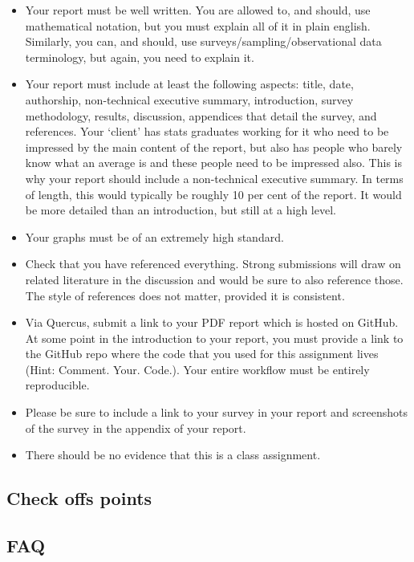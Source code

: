 \documentclass[
]{book}
\begin{document}
\begin{itemize}
\item
  Your report must be well written. You are allowed to, and should, use mathematical notation, but you must explain all of it in plain english. Similarly, you can, and should, use surveys/sampling/observational data terminology, but again, you need to explain it.
\item
  Your report must include at least the following aspects: title, date, authorship, non-technical executive summary, introduction, survey methodology, results, discussion, appendices that detail the survey, and references. Your `client' has stats graduates working for it who need to be impressed by the main content of the report, but also has people who barely know what an average is and these people need to be impressed also. This is why your report should include a non-technical executive summary. In terms of length, this would typically be roughly 10 per cent of the report. It would be more detailed than an introduction, but still at a high level.
\item
  Your graphs must be of an extremely high standard.
\item
  Check that you have referenced everything. Strong submissions will draw on related literature in the discussion and would be sure to also reference those. The style of references does not matter, provided it is consistent.
\item
  Via Quercus, submit a link to your PDF report which is hosted on GitHub. At some point in the introduction to your report, you must provide a link to the GitHub repo where the code that you used for this assignment lives (Hint: Comment. Your. Code.). Your entire workflow must be entirely reproducible.
\item
  Please be sure to include a link to your survey in your report and screenshots of the survey in the appendix of your report.
\item
  There should be no evidence that this is a class assignment.
\end{itemize}

\hypertarget{check-offs-points-4}{%
\subsection{Check offs points}\label{check-offs-points-4}}

\hypertarget{faq-4}{%
\subsection{FAQ}\label{faq-4}}
\end{document}
